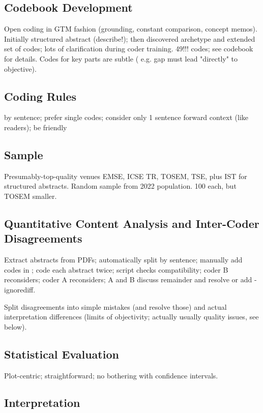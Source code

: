 \documentclass[10pt,journal,compsoc]{IEEEtran}
\begin{document}
\subsection{Codebook Development}

\noindent
Open coding in GTM fashion (grounding, constant comparison, concept memos).
Initially structured abstract (describe!); then discovered archetype and extended set of codes; lots of clarification during coder training.
49!!! codes; see codebook for details.
Codes for key parts are subtle ( e.g. gap must lead "directly" to objective).


\subsection{Coding Rules}

\noindent
by sentence; prefer single codes; consider only 1 sentence forward context (like readers); be friendly


\subsection{Sample}

\noindent
Presumably-top-quality venues EMSE, ICSE TR, TOSEM, TSE,
plus IST for structured abstracts.
Random sample from 2022 population.
100 each, but TOSEM smaller.


\subsection{Quantitative Content Analysis and Inter-Coder Disagreements}

\noindent
Extract abstracts from PDFs; automatically split by sentence; manually add codes in {{}};
code each abstract twice; script checks compatibility; coder B reconsiders; coder A reconsiders;
A and B discuss remainder and resolve or add -ignorediff.

Split disagreements into simple mistakes (and resolve those) and actual interpretation differences
(limits of objectivity; actually usually quality issues, see below).


\subsection{Statistical Evaluation}

\noindent
Plot-centric; straightforward; no bothering with confidence intervals.


\subsection{Interpretation}
\end{document}
